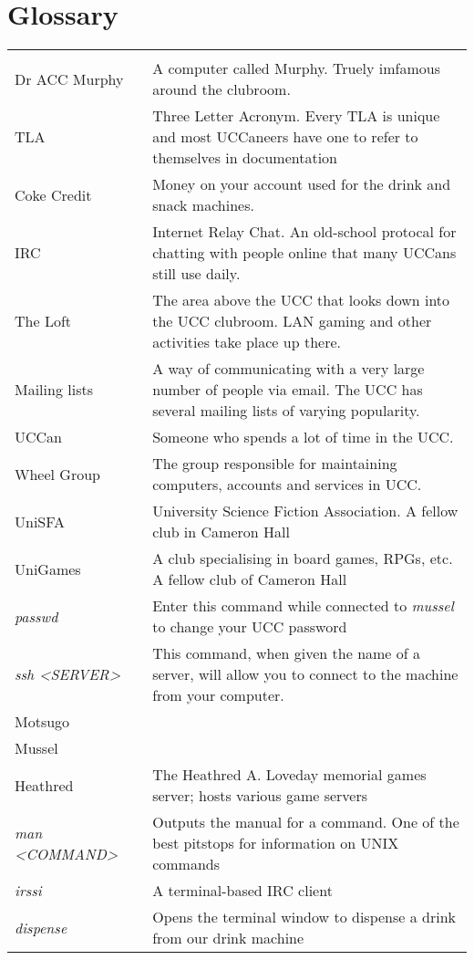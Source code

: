 \chapter{Glossary}
\renewcommand{\familydefault}{\ttdefault}

\begin{tabular}{p{0.3\linewidth}|p{0.7\linewidth}}
\rowcolor{black} \color{white}{Term} & \color{white}{Translation} \\
Dr ACC Murphy			&	A computer called Murphy. Truely imfamous around the clubroom. \\
TLA						&	Three Letter Acronym. Every TLA is unique and most UCCaneers have one to refer to themselves in documentation	\\
Coke Credit				&	Money on your account used for the drink and snack machines. \\
IRC						&	Internet Relay Chat. An old-school protocal for chatting with people online that many UCCans still use daily. \\
The Loft				&	The area above the UCC that looks down into the UCC clubroom. LAN gaming and other activities take place up there. \\
Mailing lists			&	A way of communicating with a very large number of people via email. The UCC has several mailing lists of varying popularity.\\
UCCan					&	Someone who spends a lot of time in the UCC. \\
Wheel Group				&	The group responsible for maintaining computers, accounts and services in UCC. \\
UniSFA					&	University Science Fiction Association. A fellow club in Cameron Hall \\
UniGames				&	A club specialising in board games, RPGs, etc. A fellow club of Cameron Hall \\
\textit{passwd}			&	Enter this command while connected to \textit{mussel} to change your UCC password \\
\textit{ssh <SERVER>}	&	This command, when given the name of a server, will allow you to connect to the machine from your computer.	\\
Motsugo					&	\\
Mussel					&	\\
Heathred				&	The Heathred A. Loveday memorial games server; hosts various game servers \\
\textit{man <COMMAND>}	&	Outputs the manual for a command. One of the best pitstops for information on UNIX commands	\\
\textit{irssi}			&	A terminal-based IRC client	\\
\textit{dispense}		&	Opens the terminal window to dispense a drink from our drink machine \\
\end{tabular}
